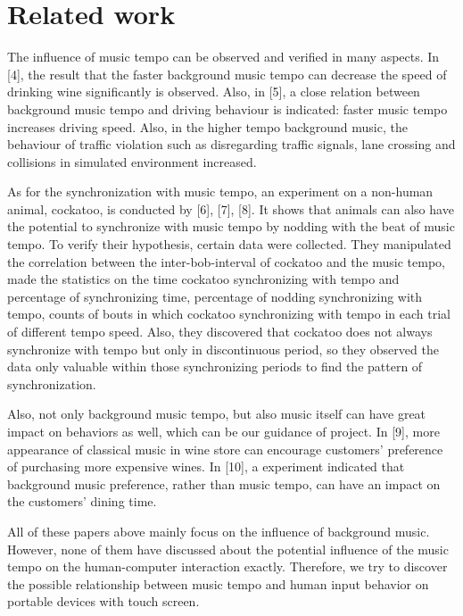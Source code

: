 \section{Related work}

The influence of music tempo can be observed and verified in many aspects. In [4], the result that the faster background music tempo can decrease the speed of drinking wine significantly is observed. Also, in [5], a close relation between background music tempo and driving behaviour is indicated: faster music tempo increases driving speed. Also, in the higher tempo background music, the behaviour of traffic violation such as disregarding traffic signals, lane crossing and collisions in simulated environment increased. 

As for the synchronization with music tempo, an experiment on a non-human animal, cockatoo, is conducted by [6], [7], [8]. It shows that animals can also have the potential to synchronize with music tempo by nodding with the beat of music tempo. To verify their hypothesis, certain data were collected. They manipulated the correlation between the inter-bob-interval of cockatoo and the music tempo, made the statistics on the time cockatoo synchronizing with tempo and percentage of synchronizing time, percentage of nodding synchronizing with tempo, counts of bouts in which cockatoo synchronizing with tempo in each trial of different tempo speed. Also, they discovered that cockatoo does not always synchronize with tempo but only in discontinuous period, so they observed the data only valuable within those synchronizing periods to find the pattern of synchronization.

Also, not only background music tempo, but also music itself can have great impact on behaviors as well, which can be our guidance of project. In [9], more appearance of classical music in wine store can encourage customers' preference of purchasing more expensive wines. In [10], a experiment indicated that background music preference, rather than music tempo, can have an impact on the customers' dining time. 

All of these papers above mainly focus on the influence of background music. However, none of them have discussed about the potential influence of the music tempo on the human-computer interaction exactly. Therefore, we try to discover the possible relationship between music tempo and human input behavior on portable devices with touch screen.
